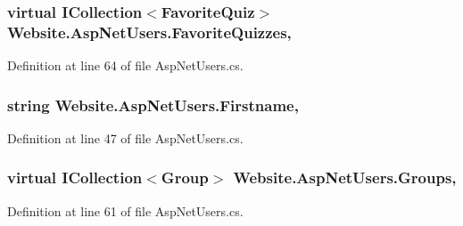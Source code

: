 \hypertarget{class_website_1_1_asp_net_users_ae047531ab98f7ace108ddb482f0112c8}{}
\subsubsection[{Favorite\+Quizzes}]{\setlength{\rightskip}{0pt plus 5cm}virtual I\+Collection$<${\bf Favorite\+Quiz}$>$ Website.\+Asp\+Net\+Users.\+Favorite\+Quizzes\hspace{0.3cm}{\ttfamily [get]}, {\ttfamily [set]}}\label{class_website_1_1_asp_net_users_ae047531ab98f7ace108ddb482f0112c8}


Definition at line 64 of file Asp\+Net\+Users.\+cs.

\hypertarget{class_website_1_1_asp_net_users_a57c852b3aab29948c69ea8711631019e}{}
\subsubsection[{Firstname}]{\setlength{\rightskip}{0pt plus 5cm}string Website.\+Asp\+Net\+Users.\+Firstname\hspace{0.3cm}{\ttfamily [get]}, {\ttfamily [set]}}\label{class_website_1_1_asp_net_users_a57c852b3aab29948c69ea8711631019e}


Definition at line 47 of file Asp\+Net\+Users.\+cs.

\hypertarget{class_website_1_1_asp_net_users_aaebce63df46185a8990b794e3d5c17a4}{}
\subsubsection[{Groups}]{\setlength{\rightskip}{0pt plus 5cm}virtual I\+Collection$<${\bf Group}$>$ Website.\+Asp\+Net\+Users.\+Groups\hspace{0.3cm}{\ttfamily [get]}, {\ttfamily [set]}}\label{class_website_1_1_asp_net_users_aaebce63df46185a8990b794e3d5c17a4}


Definition at line 61 of file Asp\+Net\+Users.\+cs.

\hypertarget{class_website_1_1_asp_net_users_a2c195fc5927d9592974ba250b28815e2}{}
